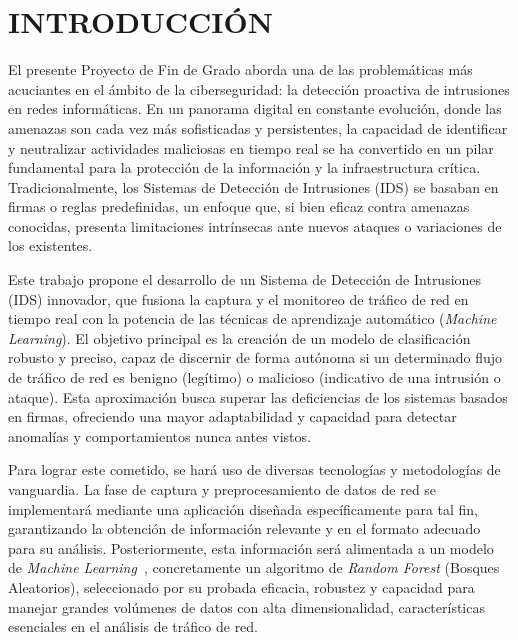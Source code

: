 
\chapter{INTRODUCCIÓN}  

El presente Proyecto de Fin de Grado aborda una de las problemáticas más acuciantes en el ámbito de la ciberseguridad: la detección proactiva de intrusiones en redes informáticas. En un panorama digital en constante evolución, donde las amenazas son cada vez más sofisticadas y persistentes, la capacidad de identificar y neutralizar actividades maliciosas en tiempo real se ha convertido en un pilar fundamental para la protección de la información y la infraestructura crítica. Tradicionalmente, los Sistemas de Detección de Intrusiones (IDS) se basaban en firmas o reglas predefinidas, un enfoque que, si bien eficaz contra amenazas conocidas, presenta limitaciones intrínsecas ante nuevos ataques o variaciones de los existentes.

Este trabajo propone el desarrollo de un Sistema de Detección de Intrusiones (IDS) innovador, que fusiona la captura y el monitoreo de tráfico de red en tiempo real con la potencia de las técnicas de aprendizaje automático (\textit{Machine Learning}). El objetivo principal es la creación de un modelo de clasificación robusto y preciso, capaz de discernir de forma autónoma si un determinado flujo de tráfico de red es benigno (legítimo) o malicioso (indicativo de una intrusión o ataque). Esta aproximación busca superar las deficiencias de los sistemas basados en firmas, ofreciendo una mayor adaptabilidad y capacidad para detectar anomalías y comportamientos nunca antes vistos.

Para lograr este cometido, se hará uso de diversas tecnologías y metodologías de vanguardia. La fase de captura y preprocesamiento de datos de red se implementará mediante una aplicación diseñada específicamente para tal fin, garantizando la obtención de información relevante y en el formato adecuado para su análisis. Posteriormente, esta información será alimentada a un modelo de \textit{Machine Learning}~\cite{bishop2007prml}, concretamente un algoritmo de \textit{Random Forest} (Bosques Aleatorios), seleccionado por su probada eficacia, robustez y capacidad para manejar grandes volúmenes de datos con alta dimensionalidad, características esenciales en el análisis de tráfico de red.

